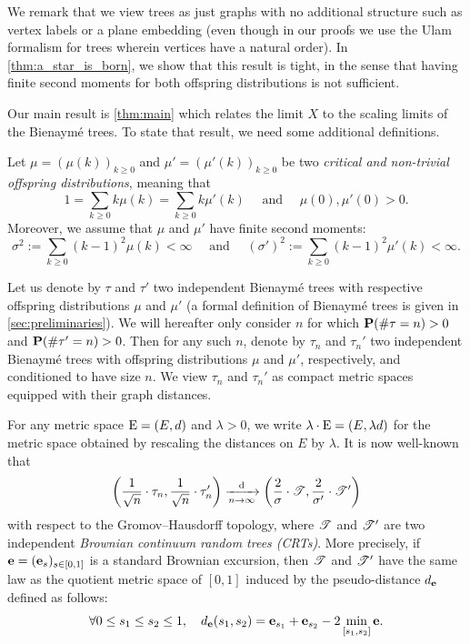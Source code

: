 \documentclass[11pt,reqno]{amsart}
\begin{document}
We remark that we view trees as just graphs with no additional structure such as vertex labels or a plane embedding (even though in our proofs we use the Ulam formalism for trees wherein vertices have a natural order).
In \cref{thm:a_star_is_born}, we show that this result is tight, in the sense that having finite second moments for both offspring distributions is not sufficient. 

Our main result is \cref{thm:main} which relates the limit $X$ to the scaling limits of the Bienaym\'e trees.
To state that result, we need some additional definitions.
\smallskip

Let $\mu=(\mu(k))_{k\geq 0}$ and $\mu'=(\mu'(k))_{k\geq 0}$ be two \emph{critical and non-trivial offspring distributions}, meaning that
\begin{equation}
\label{criticality_assumption}
1=\sum_{k\geq 0}k\mu(k)=\sum_{k\geq 0}k\mu'(k)\quad\text{ and }\quad \mu(0),\mu'(0)>0.
\end{equation}
Moreover, we assume that $\mu$ and $\mu'$ have finite second moments:
\begin{equation}
\label{finite_2-moment_assumption}
\sigma^2:=\sum_{k\geq 0}(k-1)^2\mu(k)<\infty\quad\text{ and }\quad (\sigma')^2:=\sum_{k\geq 0}(k-1)^2\mu'(k)<\infty.
\end{equation}

Let us denote by $\tau$ and $\tau'$ two independent Bienaymé trees with respective offspring distributions $\mu$ and $\mu'$ (a formal definition of Bienaym\'{e} trees is given in \cref{sec:preliminaries}). 
We will hereafter only consider $n$ for which $\P(\# \tau=n)>0$ and $\P(\# \tau'=n)>0$. Then for any such $n$, denote by $\tau_n$ and $\tau_n'$ two independent Bienaymé trees with offspring distributions $\mu$ and $\mu'$, respectively, and conditioned to have size $n$. We view $\tau_n$ and $\tau_n'$ as compact metric spaces equipped with their graph distances.

For any metric space $\rE=(E,d)$ and $\lambda>0$, we write $\lambda\cdot \rE=(E,\lambda d)$ for the metric space obtained by rescaling the distances on $E$ by $\lambda$. It is now well-known \cite{aldous1993continuumIII,haas2012scaling} that 
\begin{equation}
\label{Bienayme->CRT}
\bigg(\frac{1}{\sqrt{n}}\cdot\tau_n,\frac{1}{\sqrt{n}}\cdot\tau_n'\bigg)\xrightarrow[n\to\infty]{\mathrm d}\left(\frac{2}{\sigma}\cdot \sT,\frac{2}{\sigma'}\cdot \sT'\right)
\end{equation}
with respect to the Gromov--Hausdorff topology, where $\sT$ and $\sT'$ are two independent \emph{Brownian continuum random trees (CRTs)}. More precisely, if $\be=(\be_s)_{s\in[0,1]}$ is a standard Brownian excursion, then $\sT$ and $\sT'$ have the same law as the quotient metric space of $[0,1]$ induced by the pseudo-distance $d_{\be}$ defined as follows:
\[\forall 0\leq s_1\leq s_2\leq 1,\quad d_{\be}(s_1,s_2)=\be_{s_1}+\be_{s_2}-2\min_{[s_1,s_2]}\be.\]
\end{document}

